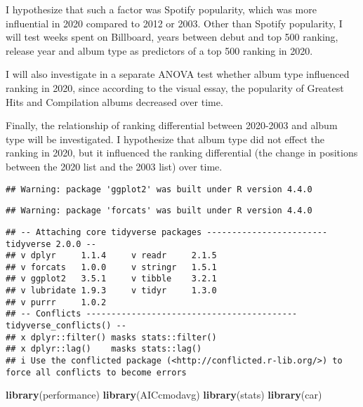 \documentclass[
]{article}
\newenvironment{Shaded}{\begin{snugshade}}{\end{snugshade}}
\newcommand{\AttributeTok}[1]{\textcolor[rgb]{0.13,0.29,0.53}{#1}}
\newcommand{\ConstantTok}[1]{\textcolor[rgb]{0.56,0.35,0.01}{#1}}
\newcommand{\FunctionTok}[1]{\textcolor[rgb]{0.13,0.29,0.53}{\textbf{#1}}}
\newcommand{\NormalTok}[1]{#1}
\newcommand{\SpecialCharTok}[1]{\textcolor[rgb]{0.81,0.36,0.00}{\textbf{#1}}}
\begin{document}
I hypothesize that such a factor was Spotify popularity, which was more
influential in 2020 compared to 2012 or 2003. Other than Spotify
popularity, I will test weeks spent on Billboard, years between debut
and top 500 ranking, release year and album type as predictors of a top
500 ranking in 2020.

I will also investigate in a separate ANOVA test whether album type
influenced ranking in 2020, since according to the visual essay, the
popularity of Greatest Hits and Compilation albums decreased over time.

Finally, the relationship of ranking differential between 2020-2003 and
album type will be investigated. I hypothesize that album type did not
effect the ranking in 2020, but it influenced the ranking differential
(the change in positions between the 2020 list and the 2003 list) over
time.

\begin{Shaded}
\end{Shaded}

\begin{verbatim}
## Warning: package 'ggplot2' was built under R version 4.4.0
\end{verbatim}

\begin{verbatim}
## Warning: package 'forcats' was built under R version 4.4.0
\end{verbatim}

\begin{verbatim}
## -- Attaching core tidyverse packages ------------------------ tidyverse 2.0.0 --
## v dplyr     1.1.4     v readr     2.1.5
## v forcats   1.0.0     v stringr   1.5.1
## v ggplot2   3.5.1     v tibble    3.2.1
## v lubridate 1.9.3     v tidyr     1.3.0
## v purrr     1.0.2     
## -- Conflicts ------------------------------------------ tidyverse_conflicts() --
## x dplyr::filter() masks stats::filter()
## x dplyr::lag()    masks stats::lag()
## i Use the conflicted package (<http://conflicted.r-lib.org/>) to force all conflicts to become errors
\end{verbatim}

\begin{Shaded}
\begin{Highlighting}[]
\FunctionTok{library}\NormalTok{(performance)}
\FunctionTok{library}\NormalTok{(AICcmodavg)}
\FunctionTok{library}\NormalTok{(stats)}
\FunctionTok{library}\NormalTok{(car)}
\end{Highlighting}
\end{Shaded}
\end{document}
